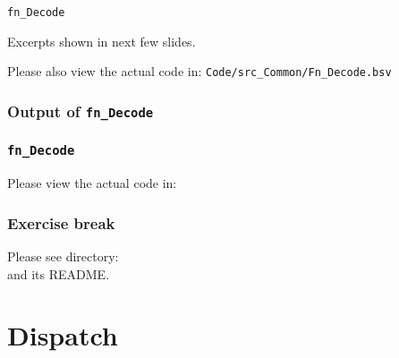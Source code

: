 \begin{frame}

\begin{center}
  {\LARGE\tt fn\_Decode}

  \vspace{5ex}

  Excerpts shown in next few slides.

  Please also view the actual code in:
  {\tt Code/src\_Common/Fn\_Decode.bsv}

\end{center}

\end{frame}


\begin{frame}[fragile]
\frametitle{Output of {\tt fn\_Decode}}

\footnotesize


\end{frame}


\begin{frame}
\frametitle{{\tt fn\_Decode}}

\footnotesize

\begin{center}\large
 Please view the actual code in: 
\end{center}

\end{frame}


\begin{frame}
\frametitle{\EmojiExercise \hmm Exercise break}

Please see directory:  \\
and its README.

\end{frame}


\section{Dispatch}

